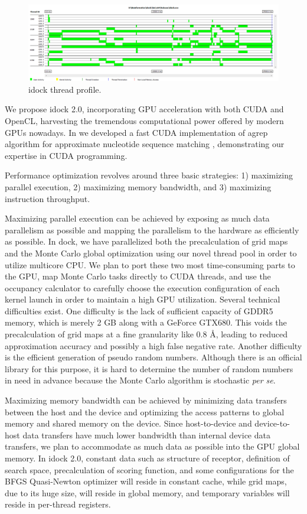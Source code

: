 \begin{figure}
\centering
\includegraphics[width=\textwidth]{idock/ThreadProfile.png}
\caption{idock thread profile.}
\label{idock:ThreadProfile}
\end{figure}

We propose idock 2.0, incorporating GPU acceleration with both CUDA and OpenCL, harvesting the tremendous computational power offered by modern GPUs nowadays. In \citeyear{1138} we developed a fast CUDA implementation of agrep algorithm for approximate nucleotide sequence matching \citep{1138}, demonstrating our expertise in CUDA programming.

Performance optimization revolves around three basic strategies: 1) maximizing parallel execution, 2) maximizing memory bandwidth, and 3) maximizing instruction throughput.

Maximizing parallel execution can be achieved by exposing as much data parallelism as possible and mapping the parallelism to the hardware as efficiently as possible. In dock, we have parallelized both the precalculation of grid maps and the Monte Carlo global optimization using our novel thread pool in order to utilize multicore CPU. We plan to port these two most time-consuming parts to the GPU, map Monte Carlo tasks directly to CUDA threads, and use the occupancy calculator to carefully choose the execution configuration of each kernel launch in order to maintain a high GPU utilization. Several technical difficulties exist. One difficulty is the lack of sufficient capacity of GDDR5 memory, which is merely 2 GB along with a GeForce GTX680. This voids the precalculation of grid maps at a fine granularity like 0.8 \AA, leading to reduced approximation accuracy and possibly a high false negative rate. Another difficulty is the efficient generation of pseudo random numbers. Although there is an official library for this purpose, it is hard to determine the number of random numbers in need in advance because the Monte Carlo algorithm is stochastic \textit{per se}.

Maximizing memory bandwidth can be achieved by minimizing data transfers between the host and the device and optimizing the access patterns to global memory and shared memory on the device. Since host-to-device and device-to-host data transfers have much lower bandwidth than internal device data transfers, we plan to accommodate as much data as possible into the GPU global memory. In idock 2.0, constant data such as structure of receptor, definition of search space, precalculation of scoring function, and some configurations for the BFGS Quasi-Newton optimizer will reside in constant cache, while grid maps, due to its huge size, will reside in global memory, and temporary variables will reside in per-thread registers.

